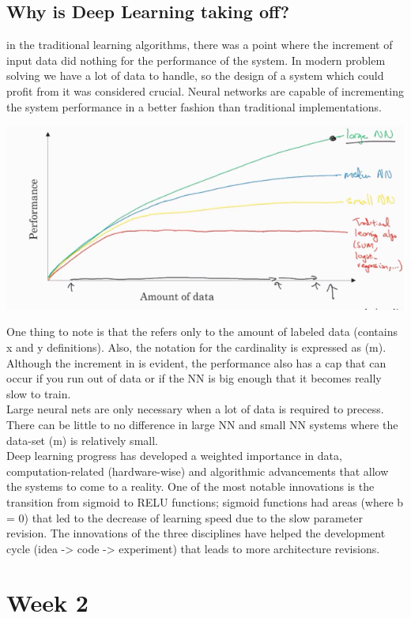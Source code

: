 \documentclass[11pt]{report}
\begin{document}
\subsection*{Why is Deep Learning taking off?}
in the traditional learning algorithms, there was a point where the increment of input data did nothing for the performance of the system. In modern problem solving we have a lot of data to handle, so the design of a system which could profit from it was considered crucial. Neural networks are capable of incrementing the system performance in a better fashion than traditional implementations. 
\begin{center}
	\includegraphics[width = .50\textwidth]{PRGR.png}
\end{center}
One thing to note is that the  refers only to the amount of labeled data (contains x and y definitions). Also, the notation for the cardinality is expressed as (m).\\
Although the increment in  is evident, the performance also has a cap that can occur if you run out of data or if the NN is big enough that it becomes really slow to train.\\
Large neural nets are only necessary when a lot of data is required to precess. There can be little to no difference in large NN and small NN systems where the data-set (m) is relatively small.\\
Deep learning progress has developed a weighted importance in data, computation-related (hardware-wise) and algorithmic advancements that allow the systems to come to a reality. One of the most notable innovations is the transition from sigmoid to RELU functions; sigmoid functions had areas (where b = 0) that led to the decrease of learning speed due to the slow parameter revision. The innovations of the three disciplines have helped the development cycle (idea -> code -> experiment) that leads to more architecture revisions.

\section{Week 2}
\end{document}
